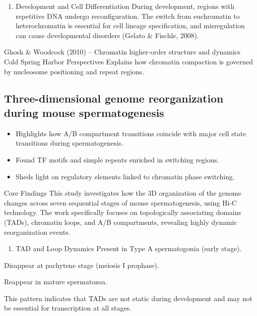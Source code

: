 \documentclass[
  a4paper,
  openany]{scrbook}
\providecommand{\tightlist}{%
  \setlength{\itemsep}{0pt}\setlength{\parskip}{0pt}}
\begin{document}
\begin{enumerate}
\def\labelenumi{\arabic{enumi}.}
\setcounter{enumi}{3}
\tightlist
\item
  Development and Cell Differentiation During development, regions with
  repetitive DNA undergo reconfiguration. The switch from euchromatin to
  heterochromatin is essential for cell lineage specification, and
  misregulation can cause developmental disorders (Gelato \& Fischle,
  2008).
\end{enumerate}

Ghosh \& Woodcock (2010) -- Chromatin higher-order structure and
dynamics Cold Spring Harbor Perspectives Explains how chromatin
compaction is governed by nucleosome positioning and repeat regions.

\subsection{Three-dimensional genome reorganization during mouse
spermatogenesis}\label{three-dimensional-genome-reorganization-during-mouse-spermatogenesis}

\begin{itemize}
\tightlist
\item
  Highlights how A/B compartment transitions coincide with major cell
  state transitions during spermatogenesis.
\item
  Found TF motifs and simple repeats enriched in switching regions.
\item
  Sheds light on regulatory elements linked to chromatin phase
  switching.
\end{itemize}

Core Findings This study investigates how the 3D organization of the
genome changes across seven sequential stages of mouse spermatogenesis,
using Hi-C technology. The work specifically focuses on topologically
associating domains (TADs), chromatin loops, and A/B compartments,
revealing highly dynamic reorganization events.

\begin{enumerate}
\def\labelenumi{\arabic{enumi}.}
\tightlist
\item
  TAD and Loop Dynamics Present in Type A spermatogonia (early stage).
\end{enumerate}

Disappear at pachytene stage (meiosis I prophase).

Reappear in mature spermatozoa.

This pattern indicates that TADs are not static during development and
may not be essential for transcription at all stages.
\end{document}
